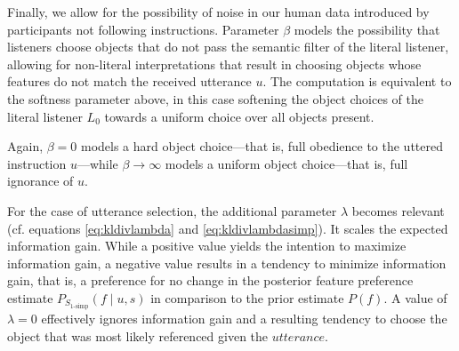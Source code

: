 \documentclass[10pt,a4paper]{article}
\begin{document}


Finally, we allow for the possibility of noise in our human data introduced by participants not following instructions.
Parameter $\beta$ models the possibility that listeners choose objects that do not pass the semantic filter of the literal listener, allowing for non-literal interpretations that result in choosing objects whose features do not match the received utterance $u$. 
The computation is equivalent to the softness parameter above, in this case softening the object choices of the literal listener $L_0$ towards a uniform choice over all objects present. 

Again, $\beta=0$ models a hard object choice---that is, full obedience to the uttered instruction $u$---while $\beta \rightarrow \infty$ models a uniform object choice---that is, full ignorance of $u$.


For the case of utterance selection, the additional parameter $\lambda$ becomes relevant
(cf. equations \ref{eq:kldivlambda} and \ref{eq:kldivlambdasimp}). 
It scales the expected information gain. 
While a positive value yields the intention to maximize information gain, 
a negative value results in a tendency to minimize information gain, that is, a preference for no change in the posterior feature preference estimate $P_{S_{1\textrm{-simp}}}(f\mid u,s)$ in comparison to the prior estimate $P(f)$. 
A value of $\lambda=0$ effectively ignores information gain and a resulting tendency to choose the object that was most likely referenced given the $utterance$.



\setlength{\bibleftmargin}{.125in}
\setlength{\bibindent}{-\bibleftmargin}


\end{document}
